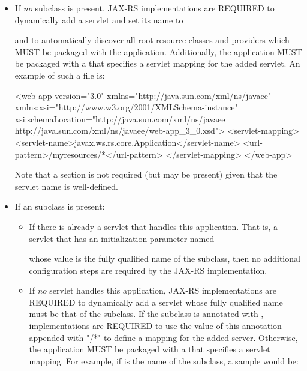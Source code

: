 \begin{itemize}
\item If {\em no}  subclass is present, JAX-RS implementations are REQUIRED to dynamically add a servlet and set its name to
\begin{quote}\end{quote} and to automatically discover all root resource classes and providers which MUST be packaged with the application. Additionally, the application MUST be packaged with a  that specifies a servlet mapping for the added servlet. An example of such a  file is:

\begin{listing}{1}
<web-app version="3.0" xmlns="http://java.sun.com/xml/ns/javaee" 
    xmlns:xsi="http://www.w3.org/2001/XMLSchema-instance" 
    xsi:schemaLocation="http://java.sun.com/xml/ns/javaee 
        http://java.sun.com/xml/ns/javaee/web-app_3_0.xsd">
    <servlet-mapping>
        <servlet-name>javax.ws.rs.core.Application</servlet-name>
        <url-pattern>/myresources/*</url-pattern>
    </servlet-mapping>
</web-app>
\end{listing} 

Note that a  section is not required (but may be present) given that the servlet name is well-defined.

\item If an  subclass is present:

\begin{itemize}
\item If there is already a servlet that handles this application. That is, a servlet that has an initialization parameter named
\begin{quote}\end{quote}  whose value is the fully qualified name of the  subclass, then no additional configuration steps are required by the JAX-RS implementation.

\item If {\em no} servlet handles this application, JAX-RS implementations are REQUIRED to dynamically add a servlet whose fully qualified name must be that of the  subclass. If the  subclass is annotated with \ApplicationPath, implementations are REQUIRED to use the value of this annotation appended with "/*" to define a mapping for the added server. Otherwise, the application MUST be packaged with a  that specifies a servlet mapping. For example, if  is the name of the  subclass, a sample  would be:


\end{itemize}
\end{itemize}
